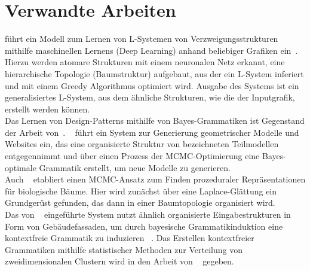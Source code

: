 \section{Verwandte Arbeiten}

\citeauthor{guo_2020} führt ein Modell zum Lernen von L-Systemen von Verzweigungsstrukturen mithilfe maschinellen
Lernens (Deep Learning) anhand beliebiger Grafiken ein~\cite{guo_2020}.
Hierzu werden atomare Strukturen mit einem neuronalen Netz erkannt, eine hierarchische Topologie (Baumstruktur)
aufgebaut, aus der ein L-System inferiert und mit einem Greedy Algorithmus optimiert wird.
Ausgabe des Systems ist ein generalisiertes L-System, aus dem ähnliche Strukturen, wie die der Inputgrafik,
erstellt werden können.\\
Das Lernen von Design-Patterns mithilfe von Bayes-Grammatiken ist Gegenstand der Arbeit von~\citeauthor{talton_2012}.
~\cite{talton_2012} führt ein System zur Generierung geometrischer Modelle und Websites ein, das eine organisierte
Struktur von bezeichneten Teilmodellen entgegennimmt und über einen Prozess der MCMC-Optimierung eine Bayes-optimale
Grammatik erstellt, um neue Modelle zu generieren.\\
Auch ~\cite{stava_2014} etabliert einen MCMC-Ansatz zum Finden prozeduraler Repräsentationen für biologische Bäume.
Hier wird zunächst über eine Laplace-Glättung ein Grundgerüst gefunden, das dann in einer Baumtopologie organisiert wird.\\
Das von ~\citeauthor{martinovic_2013} eingeführte System nutzt ähnlich organisierte Eingabestrukturen in Form von
Gebäudefassaden, um durch bayesische Grammatikinduktion eine kontextfreie Grammatik zu induzieren ~\cite{martinovic_2013}.
Das Erstellen kontextfreier Grammatiken mithilfe statistischer Methoden zur Verteilung von zweidimensionalen Clustern
wird in den Arbeit von ~\citeauthor{stava_2010} gegeben.

